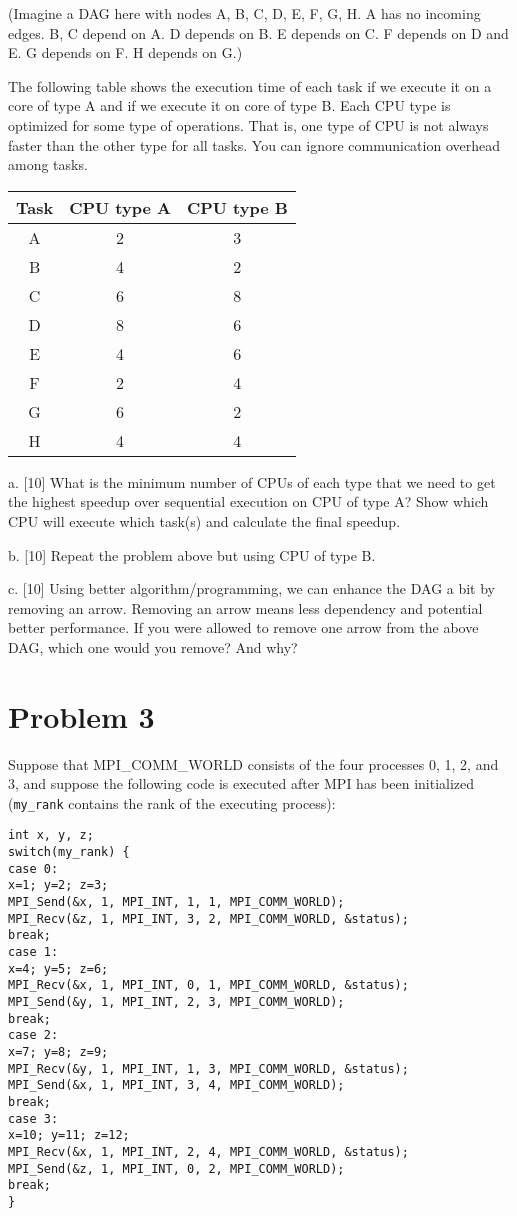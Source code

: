 \documentclass{article}
\begin{document}
(Imagine a DAG here with nodes A, B, C, D, E, F, G, H.  A has no incoming edges. B, C depend on A. D depends on B. E depends on C. F depends on D and E. G depends on F. H depends on G.)

The following table shows the execution time of each task if we execute it on a core of type A and if we execute it on core of type B. Each CPU type is optimized for some type of operations. That is, one type of CPU is not always faster than the other type for all tasks. You can ignore communication overhead among tasks.

\begin{tabular}{|c|c|c|}
\hline
Task & CPU type A & CPU type B \\ \hline
A & 2 & 3 \\ \hline
B & 4 & 2 \\ \hline
C & 6 & 8 \\ \hline
D & 8 & 6 \\ \hline
E & 4 & 6 \\ \hline
F & 2 & 4 \\ \hline
G & 6 & 2 \\ \hline
H & 4 & 4 \\ \hline
\end{tabular}

a. [10] What is the minimum number of CPUs of each type that we need to get the highest speedup over sequential execution on CPU of type A? Show which CPU will execute which task(s) and calculate the final speedup.

b. [10] Repeat the problem above but using CPU of type B.

c. [10] Using better algorithm/programming, we can enhance the DAG a bit by removing an arrow. Removing an arrow means less dependency and potential better performance. If you were allowed to remove one arrow from the above DAG, which one would you remove? And why?


\section*{Problem 3}
Suppose that MPI\_COMM\_WORLD consists of the four processes 0, 1, 2, and 3, and suppose the following code is executed after MPI has been initialized (\texttt{my\_rank} contains the rank of the executing process):

\begin{verbatim}
int x, y, z;
switch(my_rank) {
case 0:
x=1; y=2; z=3;
MPI_Send(&x, 1, MPI_INT, 1, 1, MPI_COMM_WORLD);
MPI_Recv(&z, 1, MPI_INT, 3, 2, MPI_COMM_WORLD, &status);
break;
case 1:
x=4; y=5; z=6;
MPI_Recv(&x, 1, MPI_INT, 0, 1, MPI_COMM_WORLD, &status);
MPI_Send(&y, 1, MPI_INT, 2, 3, MPI_COMM_WORLD);
break;
case 2:
x=7; y=8; z=9;
MPI_Recv(&y, 1, MPI_INT, 1, 3, MPI_COMM_WORLD, &status);
MPI_Send(&x, 1, MPI_INT, 3, 4, MPI_COMM_WORLD);
break;
case 3:
x=10; y=11; z=12;
MPI_Recv(&x, 1, MPI_INT, 2, 4, MPI_COMM_WORLD, &status);
MPI_Send(&z, 1, MPI_INT, 0, 2, MPI_COMM_WORLD);
break;
}
\end{verbatim}
\end{document}
